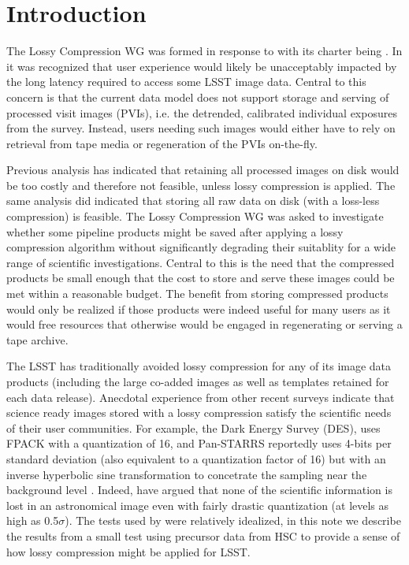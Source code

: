 
\section{Introduction}

The Lossy Compression WG was formed in response to  with its charter
being .  In  it was recognized that user 
experience would likely be unacceptably impacted by the long latency required to 
access some LSST image data.  Central to this concern is that the current data model 
does not support storage and serving of processed visit images (PVIs), i.e. the 
detrended, calibrated individual exposures from the survey.  Instead, users needing
such images would either have to rely on retrieval from tape media or regeneration
of the PVIs on-the-fly.

Previous analysis has indicated that retaining all processed images on disk would 
be too costly and therefore not feasible, unless lossy compression is applied. 
The same analysis did indicated that storing all raw data on disk (with a loss-less 
compression) is feasible.  The Lossy Compression WG was asked to investigate whether 
some pipeline products might be saved after applying a lossy compression algorithm 
without significantly degrading their suitablity for a wide range of scientific 
investigations.  Central to this is the need that the compressed products be small 
enough that the cost to store and serve these images could be met within a reasonable 
budget.  The benefit from storing compressed products would only be realized if those 
products were indeed useful for many users as it would free resources that otherwise
would be engaged in regenerating or serving a tape archive.

The LSST has traditionally avoided lossy compression for any of its image data products 
(including the large co-added images as well as templates retained for each data release). 
Anecdotal experience from other recent surveys indicate that science ready images stored
with a lossy compression satisfy the scientific needs of their user communities.  For example, 
the Dark Energy Survey (DES), uses FPACK \citep{PSW2009} with a quantization of 16, 
and Pan-STARRS reportedly uses 4-bits per standard deviation (also equivalent to a 
quantization factor of 16) but with an inverse hyperbolic sine transformation to concetrate 
the sampling near the background level \citep{Wetal2016}.  Indeed, \citet{PWH2010} have 
argued that none of the scientific information is lost in an astronomical image even with 
fairly drastic quantization (at levels as high as 0.5$\sigma$).  The tests used by \citet{PWH2010} 
were relatively idealized, in this note we describe the results from a small test using 
precursor data from HSC to provide a sense of how lossy compression might be applied for LSST.



